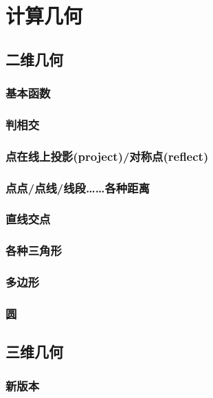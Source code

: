 \newcommand{\cgeo}[1]{}

\section{计算几何}

\subsection{二维几何}
\subsubsection{基本函数}
\cgeo{2D.d/00-2D-common.cc}
\subsubsection{判相交}
\cgeo{2D.d/01-2D-is-intersect.cc}
\subsubsection{点在线上投影(project)/对称点(reflect)}
\cgeo{2D.d/02-2D-proj-ref.cc}
\subsubsection{点点/点线/线段……各种距离}
\cgeo{2D.d/03-2D-distance.cc}
\subsubsection{直线交点}
\cgeo{2D.d/04-2D-cross-line.cc}
\subsubsection{各种三角形}
\cgeo{2D.d/05-2D-triangle.cc}
\subsubsection{多边形}
\cgeo{2D.d/06-2D-polygon.cc}
\subsubsection{圆}
\cgeo{2D.d/07-2D-circle.cc}

\subsection{三维几何}
\subsubsection{新版本}
\cgeo{3D.d/geo3d_v2.1.cpp}
\cgeo{3D.d/geo3d.cpp}

